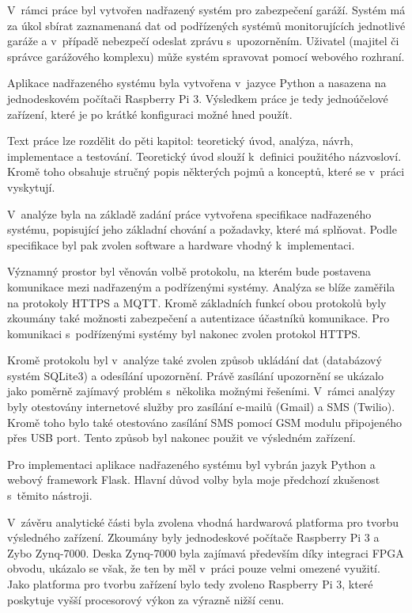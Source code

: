
V~rámci práce byl vytvořen nadřazený systém pro zabezpečení garáží. Systém má za úkol sbírat zaznamenaná dat od podřízených systémů monitorujících jednotlivé garáže a v~případě nebezpečí odeslat zprávu s~upozorněním. Uživatel (majitel či správce garážového komplexu) může systém spravovat pomocí webového rozhraní.

Aplikace nadřazeného systému byla vytvořena v~jazyce Python a nasazena na jednodeskovém počítači Raspberry Pi 3. Výsledkem práce je tedy jednoúčelové zařízení, které je po krátké konfiguraci možné hned použít.

Text práce lze rozdělit do pěti kapitol: teoretický úvod, analýza, návrh, implementace a testování. Teoretický úvod slouží k~definici použitého názvosloví. Kromě toho obsahuje stručný popis některých pojmů a konceptů, které se v~práci vyskytují.

V~analýze byla na základě zadání práce vytvořena specifikace nadřazeného systému, popisující jeho základní chování a požadavky, které má splňovat. Podle specifikace byl pak zvolen software a hardware vhodný k~implementaci.

Významný prostor byl věnován volbě protokolu, na kterém bude postavena komunikace mezi nadřazeným a podřízenými systémy. Analýza se blíže zaměřila na protokoly HTTPS a MQTT. Kromě základních funkcí obou protokolů byly zkoumány také možnosti zabezpečení a autentizace účastníků komunikace. Pro komunikaci s~podřízenými systémy byl nakonec zvolen protokol HTTPS.

Kromě protokolu byl v~analýze také zvolen způsob ukládání dat (databázový systém SQLite3) a odesílání upozornění. Právě zasílání upozornění se ukázalo jako poměrně zajímavý problém s~několika možnými řešeními. V~rámci analýzy byly otestovány internetové služby pro zasílání e-mailů (Gmail) a SMS (Twilio). Kromě toho bylo také otestováno zasílání SMS pomocí GSM modulu připojeného přes USB port. Tento způsob byl nakonec použit ve výsledném zařízení.

Pro implementaci aplikace nadřazeného systému byl vybrán jazyk Python a webový framework Flask. Hlavní důvod volby byla moje předchozí zkušenost s~těmito nástroji.

V~závěru analytické části byla zvolena vhodná hardwarová platforma pro tvorbu výsledného zařízení. Zkoumány byly jednodeskové počítače Raspberry Pi 3 a Zybo Zynq-7000. Deska Zynq-7000 byla zajímavá především díky integraci FPGA obvodu, ukázalo se však, že ten by měl v~práci pouze velmi omezené využití. Jako platforma pro tvorbu zařízení bylo tedy zvoleno Raspberry Pi 3, které poskytuje vyšší procesorový výkon za výrazně nižší cenu.

